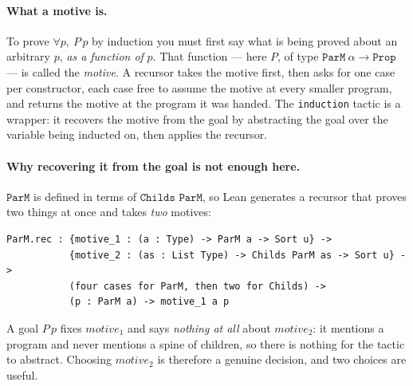 \documentclass[11pt,a4paper]{article}
\theoremstyle{definition}
\theoremstyle{plain}
\theoremstyle{remark}
\newcommand{\PM}{\texttt{ParM}}
\begin{document}
\paragraph{What a motive is.}
To prove $\forall p,\ P\,p$ by induction you must first say what is being proved about an
arbitrary $p$, \emph{as a function of} $p$. That function --- here $P$, of type
$\PM\ \alpha \to \mathtt{Prop}$ --- is called the \emph{motive}. A recursor takes the motive
first, then asks for one case per constructor, each case free to assume the motive at every
smaller program, and returns the motive at the program it was handed. The
\texttt{induction} tactic is a wrapper: it recovers the motive from the goal by abstracting
the goal over the variable being inducted on, then applies the recursor.

\paragraph{Why recovering it from the goal is not enough here.}
$\PM$ is defined in terms of $\texttt{Childs ParM}$, so Lean generates a recursor that
proves two things at once and takes \emph{two} motives:
\begin{lstlisting}
ParM.rec : {motive_1 : (a : Type) -> ParM a -> Sort u} ->
           {motive_2 : (as : List Type) -> Childs ParM as -> Sort u} ->
           (four cases for ParM, then two for Childs) ->
           (p : ParM a) -> motive_1 a p
\end{lstlisting}
A goal $P\,p$ fixes $\mathit{motive}_1$ and says \emph{nothing at all} about
$\mathit{motive}_2$: it mentions a program and never mentions a spine of children, so there
is nothing for the tactic to abstract. Choosing $\mathit{motive}_2$ is therefore a genuine
decision, and two choices are useful.
\end{document}
